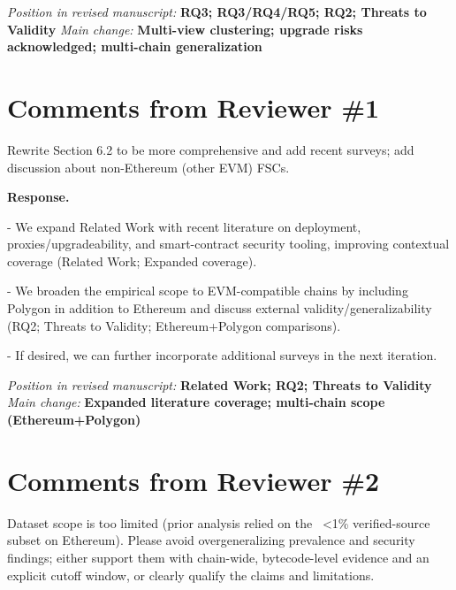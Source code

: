 \documentclass[acmsmall]{acmart}
\begin{document}
	\vspace{0.25em}
\noindent\textit{Position in revised manuscript:} {\color{red}\textbf{RQ3; RQ3/RQ4/RQ5; RQ2; Threats to Validity}}
\noindent\textit{Main change:} {\color{blue}\textbf{Multi-view clustering; upgrade risks acknowledged; multi-chain generalization}}

	\newpage
	\section{Comments from Reviewer \#1}

	\begin{tcolorbox}
		[commentbox,title=Reviewer \#1 -- Comment 1] Rewrite Section 6.2 to be more comprehensive and
		add recent surveys; add discussion about non-Ethereum (other EVM) FSCs.
	\end{tcolorbox}

	\noindent
	\textbf{Response.}

	- We expand Related Work with recent literature on deployment, proxies/upgradeability, and smart-contract
	security tooling, improving contextual coverage (Related Work; Expanded coverage).

	- We broaden the empirical scope to EVM-compatible chains by including Polygon in addition to Ethereum
	and discuss external validity/generalizability (RQ2; Threats to Validity; Ethereum+Polygon
	comparisons).

	- If desired, we can further incorporate additional surveys in the next iteration.

\vspace{0.25em}
\noindent\textit{Position in revised manuscript:} {\color{red}\textbf{Related Work; RQ2; Threats to Validity}}
\noindent\textit{Main change:} {\color{blue}\textbf{Expanded literature coverage; multi-chain scope (Ethereum+Polygon)}}

	\newpage
	\section{Comments from Reviewer \#2}

	\begin{tcolorbox}
		[commentbox,title=Reviewer \#2 -- Comment 1] Dataset scope is too limited (prior analysis
		relied on the ~<1\% verified-source subset on Ethereum). Please avoid overgeneralizing prevalence
		and security findings; either support them with chain-wide, bytecode-level evidence and an explicit
		cutoff window, or clearly qualify the claims and limitations.
	\end{tcolorbox}
\end{document}

